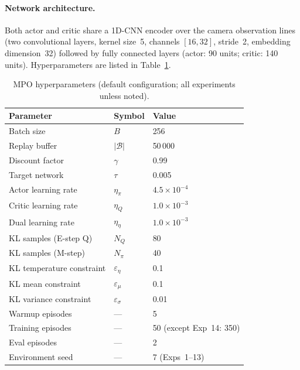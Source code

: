 \paragraph{Network architecture.}
Both actor and critic share a 1D-CNN encoder over the camera observation lines (two convolutional layers, kernel size~5, channels $[16,32]$, stride~2, embedding dimension~32)
followed by fully connected layers (actor: 90 units; critic: 140 units).
Hyperparameters are listed in Table~\ref{tab:mpo-hparams}.

\begin{table}[htbp]
  \centering
  \caption{MPO hyperparameters (default configuration; all experiments unless noted).}
  \label{tab:mpo-hparams}
  \begin{tabular}{lll}
    \toprule
    Parameter & Symbol & Value \\
    \midrule
    Batch size               & $B$               & 256 \\
    Replay buffer            & $|\mathcal{B}|$   & 50\,000 \\
    Discount factor          & $\gamma$          & 0.99 \\
    Target network           & $\tau$            & 0.005 \\
    Actor learning rate      & $\eta_\pi$        & $4.5\times10^{-4}$ \\
    Critic learning rate     & $\eta_Q$          & $1.0\times10^{-3}$ \\
    Dual learning rate       & $\eta_\eta$       & $1.0\times10^{-3}$ \\
    KL samples (E-step Q)    & $N_Q$             & 80 \\
    KL samples (M-step)      & $N_\pi$           & 40 \\
    KL temperature constraint & $\varepsilon_\eta$ & 0.1 \\
    KL mean constraint        & $\varepsilon_\mu$  & 0.1 \\
    KL variance constraint    & $\varepsilon_\sigma$& 0.01 \\
    Warmup episodes           & ---               & 5 \\
    Training episodes         & ---               & 50 (except Exp~14: 350) \\
    Eval episodes             & ---               & 2 \\
    Environment seed          & ---               & 7 (Exps~1--13) \\
    \bottomrule
  \end{tabular}
\end{table}

